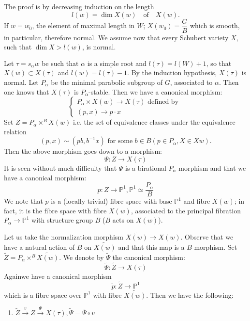 \begin{Proof}
The proof is by decreasing induction on the length 
$$
l(w)=\dim X(w)\quad\text{of}\quad X(w).
$$ 
If $w=w_0$, the element of maximal length in $W$; $X(w_0)=\dfrac{G}{B}$ which is smooth, in particular, therefore normal. We assume now that every Schubert variety $X$, such that $\dim X>l(w)$, is normal. 

Let $\tau=s_{\alpha}w$  be such that $\alpha$ is a simple root and $l(\tau)=l(W)+1$, so that $X(w)\subset X(\tau)$ and $l(w)=l(\tau)-1$. By the induction hypothesis, $X(\tau)$ is normal. Let $P_{\alpha}$ be the minimal parabolic subgroup of $G$, associated to $\alpha$. Then one knows that $X(\tau)$ is $P_{\alpha}$-stable. Then we have a canonical morphism:
$$
\begin{cases}
P_{\alpha}\times X(w)\to X(\tau) \text{ defined by }\\
(p,x)\to p\cdot x
\end{cases}
$$
\pageoriginale
Set $Z=P_{\alpha}\times ^{B} X(w)$ i.e. the set of equivalence classes under the equivalence relation 
$$
(p,x)\sim \left(pb, b^{-1} x\right)\text{ for some } b\in B (p \in P_{\alpha}, X \in X w).
$$
Then the above morphism goes down to a morphism: 
$$
\Psi: Z \to X(\tau)
$$
It is seen without much difficulty that $\Psi$ is a birational $P_{\alpha}$ morphism and that we have a canonical morphism: 
$$
p:Z\to \mathbb{P}^{1}, \mathbb{P}^{1}\simeq \dfrac{P_{\alpha}}{B}
$$
We note that $p$ is a (locally trivial) fibre space with base $\mathbb{P}^{1}$ and fibre $X(w)$; in fact, it is the fibre space with fibre $X(w)$, associated to the principal fibration $P_{\alpha} \to \mathbb{P}^{1}$ with structure group $B$ ($B$ acts on $X(w)$). 

Let us take the normalization morphism $\widetilde{X(w)}\to X(w)$. Observe that we have a natural action of $B$ on $\widetilde{X(w)}$ and that this map is a $B$-morphism. Set $\widetilde{Z}=P_{\alpha}\times^{B} \widetilde{X(w)}$. We denote by $\widetilde{\Psi}$ the canonical morphism: 
$$
\widetilde{\Psi}:\widetilde{Z}\to X(\tau)
$$
Again\pageoriginale we have a canonical morphism 
$$
\widetilde{p}:\widetilde{Z}\to \mathbb{P}^{1}
$$
which is a fibre space over $\mathbb{P}^{1}$ with fibre $\widetilde{X(w)}$. Then we have the following: 
\begin{enumerate}
\renewcommand{\theenumi}{\roman{enumi}}
\renewcommand{\labelenumi}{(\theenumi)}
\item $\widetilde{Z}\xrightarrow{v}Z\xrightarrow{\Psi}X(\tau), \widetilde{\Psi}=\overline{\Psi}\circ v$


\end{enumerate}
\end{Proof}
